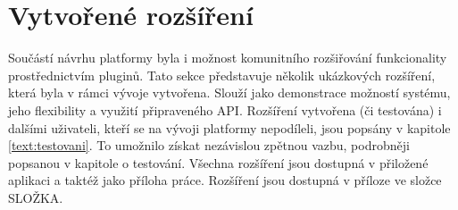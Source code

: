 







\section{Vytvořené rozšíření}\label{text:realizace/vytvoreneRozsireni}

Součástí návrhu platformy byla i možnost komunitního rozšiřování funkcionality prostřednictvím pluginů. 
Tato sekce představuje několik ukázkových rozšíření, která byla v rámci vývoje vytvořena. 
Slouží jako demonstrace možností systému, jeho flexibility a využití připraveného API. 
Rozšíření vytvořena (či testována) i dalšími uživateli, kteří se na vývoji platformy nepodíleli, jsou popsány v kapitole \ref{text:testovani}.
To umožnilo získat nezávislou zpětnou vazbu, podrobněji popsanou v kapitole o testování. Všechna rozšíření jsou dostupná v přiložené aplikaci a taktéž jako příloha práce.
Rozšíření jsou dostupná v příloze ve složce SLOŽKA.

